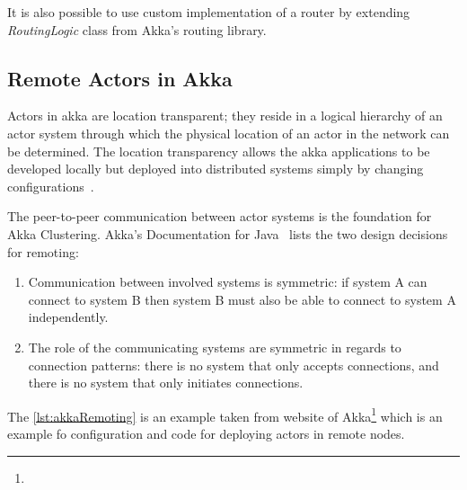 It is also possible to use custom implementation of a router by extending \emph{RoutingLogic} class from Akka's routing library.

  \subsection{Remote Actors in Akka}
  Actors in akka are location transparent; they reside in a logical hierarchy of an actor system through which the physical location of an actor in the network can be determined. The location transparency allows the akka applications to be developed locally but deployed into distributed systems simply by changing configurations~\cite{akkaJavaDoc}.

  The peer-to-peer communication between actor systems is the foundation for Akka Clustering. Akka's Documentation for Java~\cite{akkaJavaDoc} lists the two design decisions for remoting:
\begin{enumerate}

  \item Communication between involved systems is symmetric: if system A can connect to system B then system B must also be able to connect to system A independently.

  \item The role of the communicating systems are symmetric in regards to connection patterns: there is no system that only accepts connections, and there is no system that only initiates connections.
\end{enumerate}

The \autoref{lst:akkaRemoting} is an example taken from website of Akka\footnote{} which is an example fo configuration and code for deploying actors in remote nodes.

